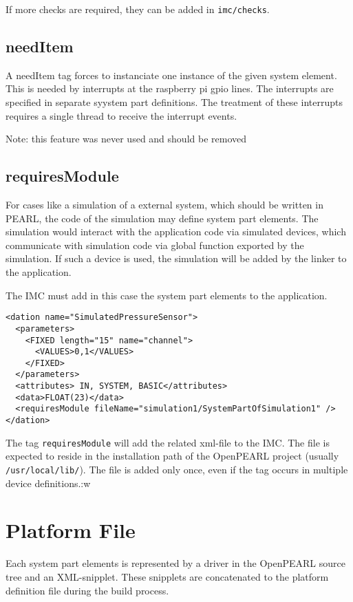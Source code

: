 If more checks are required, they can be added in \texttt{imc/checks}. 

\subsection{needItem}

A needItem tag forces to instanciate one instance of the given system element.
This is needed by interrupts at the raspberry pi gpio lines. The interrupts are
specified in separate syystem part definitions. 
The treatment of these interrupts requires a single thread to receive the 
interrupt events.

Note: this feature was never used and should be removed

\subsection{requiresModule}
For cases like a simulation of a external system, which should be written in PEARL,
the code of the simulation may define system part elements.
The simulation would interact with the application code via simulated devices, which 
communicate with simulation code via global function exported by the simulation.
If such a device is used, the simulation will be added by the linker to the application.

The IMC must add in this case the system part elements to the application.

\begin{verbatim}
<dation name="SimulatedPressureSensor">
  <parameters>
    <FIXED length="15" name="channel">
      <VALUES>0,1</VALUES>
    </FIXED>
  </parameters>
  <attributes> IN, SYSTEM, BASIC</attributes>
  <data>FLOAT(23)</data>
  <requiresModule fileName="simulation1/SystemPartOfSimulation1" />
</dation>
\end{verbatim}

The tag \texttt{requiresModule} will add the related xml-file to the IMC.
The file is expected to reside in the installation path of the OpenPEARL project 
(usually \texttt{/usr/local/lib/}). The file is added only once, even if the tag 
occurs in multiple device definitions.:w

 
\section{Platform File}
Each system part elements is represented by a driver in the OpenPEARL 
source tree and an XML-snipplet. These snipplets are
concatenated to the platform definition file during the build  process.

